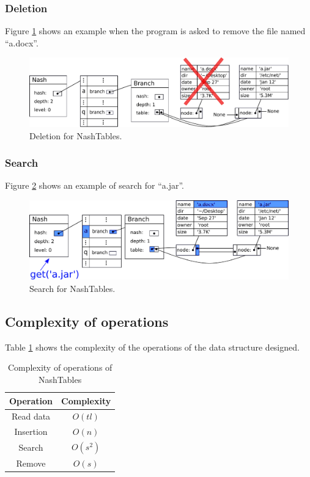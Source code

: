 \documentclass{sig-alternate-05-2015}
\begin{document}
  \subsubsection{Deletion}
  Figure \ref{img:nashRemove} shows an example when the program is asked to remove the file named
  ``a.docx''.
    \begin{figure}[t]
      \centering
      \includegraphics[scale=0.4]{NashRemove.pdf}
      \caption{Deletion for NashTables.}
      \label{img:nashRemove}
    \end{figure}

  \subsubsection{Search}
  Figure \ref{img:nashGet} shows an example of search for ``a.jar''.
  \begin{figure}[t]
    \centering
    \includegraphics[scale=0.4]{NashGet.pdf}
    \caption{Search for NashTables.}
    \label{img:nashGet}
  \end{figure}

  \subsection{Complexity of operations}
  Table \ref{table:Complex} shows the complexity of the operations of the data structure designed.
  \begin{table}[b]
  \centering
  \caption{Complexity of operations of NashTables}
  \label{table:Complex}
  \begin{tabular}{cc}
  \hline
  \textbf{Operation} & \textbf{Complexity} \\ \hline
    Read data          & $O(tl)$             \\
    Insertion          & $O(n)$              \\
    Search             & $O(s^2)$            \\
    Remove             & $O(s)$              \\ \hline
  \end{tabular}
  \end{table}
\end{document}
